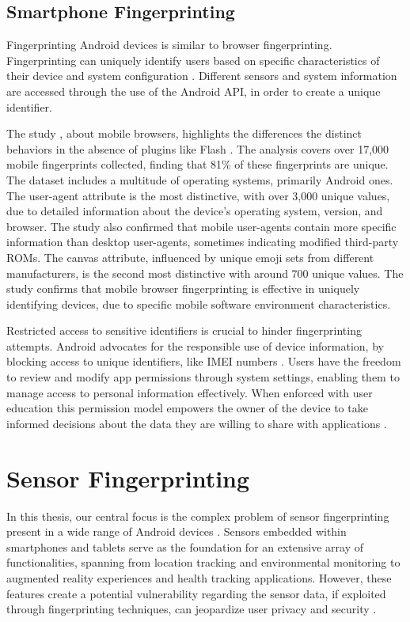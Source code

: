 \documentclass[11pt,
  oneside,openany,    %
]{scrreprt}
\begin{document}
\section{Smartphone Fingerprinting}
\label{sec:smartphone_fingerprint}
Fingerprinting Android devices is similar to browser fingerprinting.
Fingerprinting can uniquely identify users based on specific characteristics of their device and system configuration \cite{DBLP:conf/IEEEares/PalfingerP20}. 
Different sensors and system information are accessed through the use of the Android API, in order to create a unique identifier.

The study , about mobile browsers, highlights the differences the distinct behaviors in the absence of plugins like Flash \cite{gomez2017fingerprinting}.
The analysis covers over 17,000 mobile fingerprints collected, finding that 81\% of these fingerprints are unique. 
The dataset includes a multitude of operating systems, primarily Android ones.
The user-agent attribute is the most distinctive, with over 3,000 unique values, due to detailed information about the device's operating system, version, and browser. 
The study also confirmed that mobile user-agents contain more specific information than desktop user-agents, sometimes indicating modified third-party ROMs.
The canvas attribute, influenced by unique emoji sets from different manufacturers, is the second most distinctive with around 700 unique values.
The study confirms that mobile browser fingerprinting is effective in uniquely identifying devices, due to specific mobile software environment characteristics.

Restricted access to sensitive identifiers is crucial to hinder fingerprinting attempts. 
Android advocates for the responsible use of device information, by blocking access to unique identifiers, like IMEI numbers \cite{android_privacy_10, DBLP:conf/ndss/MengZXZZBLTD23}.
Users have the freedom to review and modify app permissions through system settings, enabling them to manage access to personal information effectively. 
When enforced with user education this permission model empowers the owner of the device to take informed decisions about the data they are willing to share with applications \cite{DBLP:conf/icta/NegashS15}.

\chapter{Sensor Fingerprinting}
\label{chap:sensor_fingerprint}
In this thesis, our central focus is the complex problem of sensor fingerprinting present in a wide range of Android devices \cite{DBLP:journals/comsur/BaldiniS17}. 
Sensors embedded within smartphones and tablets serve as the foundation for an extensive array of functionalities, spanning from location tracking and environmental monitoring to augmented reality experiences and health tracking applications. 
However, these features create a potential vulnerability regarding the sensor data, if exploited through fingerprinting techniques, can jeopardize user privacy and security \cite{DBLP:conf/ndss/MengZXZZBLTD23}.
\end{document}
